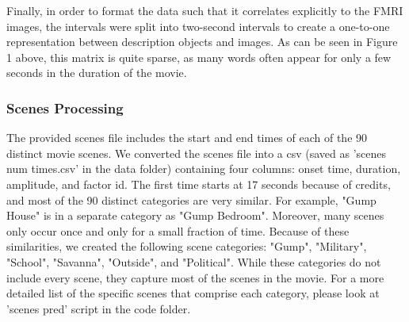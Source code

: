 Finally, in order to format the data such that it correlates explicitly
to the FMRI images, the intervals were split into two-second intervals
to create a one-to-one representation between description objects and images. As can be seen in Figure 1 above, this matrix is quite sparse, as many words often appear for only a few seconds in the duration of the movie. 

\subsubsection{Scenes Processing}
\par The provided scenes file includes the start and end times of each of the 90 distinct movie scenes. We converted the scenes file into a csv (saved as 'scenes num times.csv' in the data folder) containing four columns: onset time, duration, amplitude, and factor id. The first time starts at 17 seconds because of credits, and most of the 90 distinct categories are very similar. For example, "Gump House" is in a separate category as "Gump Bedroom". Moreover, many scenes only occur once and only for a small fraction of time. Because of these similarities, we created the following scene categories: "Gump", "Military", "School", "Savanna", "Outside", and "Political". While these categories do not include every scene, they capture most of the scenes in the movie. For a more detailed list of the specific scenes that comprise each category, please look at 'scenes pred' script in the code folder.  
